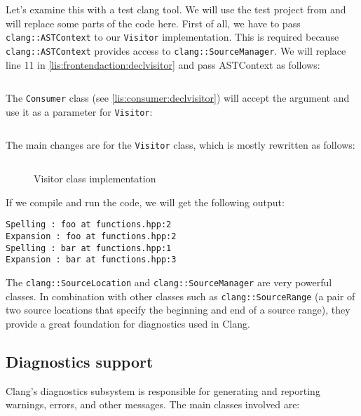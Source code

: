 Let's examine this with a test clang tool. We will use the test project from
 and will replace some parts of the code
here. First of all, we have to pass \texttt{clang::ASTContext} to our
\texttt{Visitor} implementation. This is required because
\texttt{clang::ASTContext} provides access to
\texttt{clang::SourceManager}. We will replace line 11 in
\cref{lis:frontendaction:declvisitor} and pass ASTContext as follows: 
\inputminted[highlightlines={11}, firstline=10,lastline=11]{c++}{src/part1/ch4_baselibs/recursivevisitor/FrontendAction.hpp}

The \texttt{Consumer} class (see \cref{lis:consumer:declvisitor}) will
accept the argument and use it as a parameter for \texttt{Visitor}: 
\inputminted[firstline=8,lastline=9]{c++}{src/part1/ch4_baselibs/recursivevisitor/Consumer.hpp}

The main changes are for the \texttt{Visitor} class, which is mostly rewritten as follows:
\begin{figure}[H]
\inputminted[firstline=5,lastline=27]{c++}{src/part1/ch4_baselibs/recursivevisitor/Visitor.hpp}
\caption{Visitor class implementation}
\label{lis:ch4:recursivevisitor:visitor}
\end{figure}

If we compile and run the code, we will get the following output:
\begin{adjustwidth}{0em}{0em}
\begin{verbatim}
Spelling : foo at functions.hpp:2
Expansion : foo at functions.hpp:2
Spelling : bar at functions.hpp:1
Expansion : bar at functions.hpp:3
\end{verbatim}
\end{adjustwidth}

The \texttt{clang::SourceLocation} and
\texttt{clang::SourceManager} are very powerful classes. In combination
with other classes such as \texttt{clang::SourceRange} (a pair of two
source locations that specify the beginning and end of a source range), they
provide a great foundation for diagnostics used in Clang. 

\subsection{Diagnostics support}
Clang's diagnostics subsystem is responsible for generating and reporting warnings, errors, and other messages. The main classes involved are:

